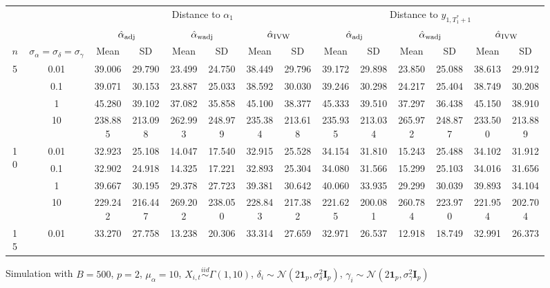 \documentclass[11pt]{article}
\newcommand{\simiid}{\stackrel{iid}{\sim}} %
\def\normal#1#2{\mathcal{N}(#1,#2)} %
\theoremstyle{definition}
\begin{document}
\begin{sidewaysfigure}
\centering
\caption{Simulation  with $B = 500$, $p = 2$, $\mu_{\alpha}=10$, $X_{i,t} \simiid \Gamma(1,10)$, $\delta_i \sim \normal{2\mathbf{1}_p}{\sigma^2_{\delta}\mathbf{I}_p}$, $\gamma_i \sim \normal{2\mathbf{1}_p}{\sigma^2_{\gamma}\mathbf{I}_p}$}
\begin{tabular}{cc|cccccc|cccccc}
  && \multicolumn{6}{c|}{Distance to $\alpha_1$}  & \multicolumn{6}{c}{Distance to $y_{1, T_1^*+1}$}  \\ 
   & & \multicolumn{2}{c}{$\hat{\alpha}_{\rm adj}$}  & \multicolumn{2}{c}{$\hat{\alpha}_{\rm wadj}$} & \multicolumn{2}{c|}{$\hat{\alpha}_{\rm IVW}$} & \multicolumn{2}{c}{$\hat{\alpha}_{\rm adj}$} & \multicolumn{2}{c}{$\hat{\alpha}_{\rm wadj}$}  & \multicolumn{2}{c}{$\hat{\alpha}_{\rm IVW}$}   \\ 
  $n$   & $\sigma_{\alpha} = \sigma_{\delta}=\sigma_{\gamma}$  & Mean & SD & Mean & SD & Mean & SD & Mean & SD & Mean & SD & Mean & SD  \\[.3cm]  
    \hline
 \multirow{4}{*}{5}  & 0.01 & 39.006 & 29.790 & 23.499 & 24.750 & 38.449 & 29.796 & 39.172 & 29.898 & 23.850 & 25.088 & 38.613 & 29.912 \\ 
    & 0.1 & 39.071 & 30.153 & 23.887 & 25.033 & 38.592 & 30.030 & 39.246 & 30.298 & 24.217 & 25.404 & 38.749 & 30.208 \\ 
   & 1   & 45.280 & 39.102 & 37.082 & 35.858 & 45.100 & 38.377 & 45.333 & 39.510 & 37.297 & 36.438 & 45.150 & 38.910 \\ 
   & 10   & 238.885 & 213.098 & 262.993 & 248.979 & 235.384 & 213.618 & 235.935 & 213.034 & 265.972 & 248.877 & 233.500 & 213.889 \\[.3cm]  
\multirow{4}{*}{10}   & 0.01 & 32.923 & 25.108 & 14.047 & 17.540 & 32.915 & 25.528 & 34.154 & 31.810 & 15.243 & 25.488 & 34.102 & 31.912 \\ 
  & 0.1 & 32.902 & 24.918 & 14.325 & 17.221 & 32.893 & 25.304 & 34.080 & 31.566 & 15.299 & 25.103 & 34.016 & 31.656 \\ 
   & 1   & 39.667 & 30.195 & 29.378 & 27.723 & 39.381 & 30.642 & 40.060 & 33.935 & 29.299 & 30.039 & 39.893 & 34.104 \\ 
 & 10   & 229.242 & 216.447 & 269.202 & 238.050 & 228.843 & 217.382 & 221.625 & 200.081 & 260.784 & 223.970 & 221.954 & 202.704\\[.3cm]  
\multirow{4}{*}{15}   & 0.01 & 33.270 & 27.758 & 13.238 & 20.306 & 33.314 & 27.659 & 32.971 & 26.537 & 12.918 & 18.749 & 32.991 & 26.373 \\ 

\end{tabular}
\end{sidewaysfigure}
\end{document}
